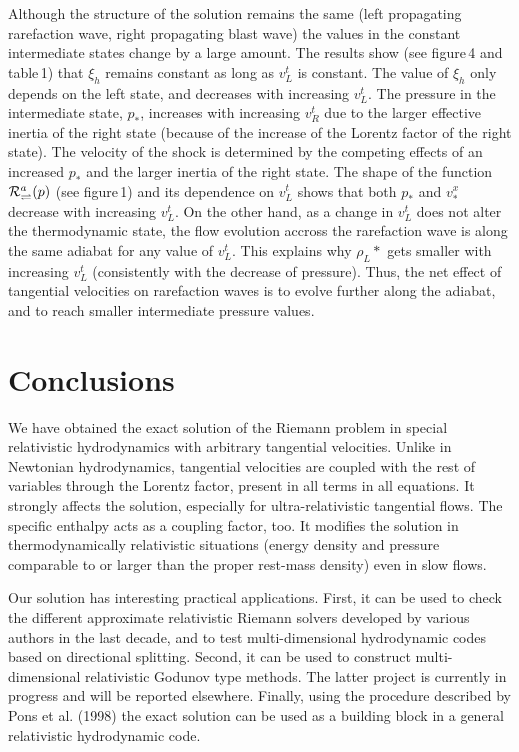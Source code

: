   Although the structure of the solution remains the same (left propagating 
rarefaction wave, right propagating blast wave) the values in the constant 
intermediate states change by a large amount. The results show (see 
figure\,4 and table\,1) that $\xi_h$ remains constant as long as $v^t_L$ is 
constant. The value of $\xi_h$ only depends on the left state, and decreases 
with increasing $v^t_L$. The pressure in the intermediate state, $p_*$, 
increases with increasing $v^t_R$ due to the larger effective inertia of the 
right state (because of the increase of the Lorentz factor of the right state). 
The velocity of the shock is determined by the competing effects of an increased 
$p_*$ and the larger inertia of the right state.  
The shape of the function ${\cal R}^a_{\rightleftharpoons}(p)$ (see
figure\,1) and its dependence on $v^t_L$ shows that both $p_*$ and
$v^x_*$ decrease with increasing $v^t_L$. On the other hand, as a
change in $v^t_L$ does not alter the thermodynamic state, the flow
evolution accross the rarefaction wave is along the same adiabat for
any value of $v^t_L$. This explains why $\rho_L*$ gets smaller with
increasing $v^t_L$ (consistently with the decrease of pressure).
Thus, the net effect of tangential velocities on rarefaction waves is
to evolve further along the adiabat, and to reach smaller intermediate
pressure values.

\section{Conclusions}

  We have obtained the exact solution of the Riemann problem in
special relativistic hydrodynamics with arbitrary tangential
velocities. Unlike in Newtonian hydrodynamics, tangential velocities
are coupled with the rest of variables through the Lorentz factor,
present in all terms in all equations. It strongly affects the
solution, especially for ultra-relativistic tangential flows. 
The specific enthalpy acts as a coupling factor, too. It modifies
the solution in thermodynamically relativistic situations (energy
density and pressure comparable to or larger than the proper rest-mass
density) even in slow flows.

  Our solution has interesting practical applications. First, it can
be used to check the different approximate relativistic Riemann
solvers developed by various authors in the last decade, and to test
multi-dimensional hydrodynamic codes based on directional
splitting. Second, it can be used to construct multi-dimensional
relativistic Godunov type methods. The latter project is currently in
progress and will be reported elsewhere. Finally, using the procedure
described by Pons et al. (1998) the exact solution can be used as a
building block in a general relativistic hydrodynamic code.


